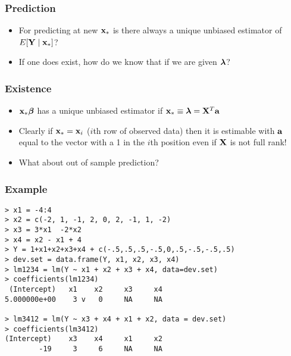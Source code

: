 \documentclass[handout]{beamer}
\begin{document}
\begin{frame} \frametitle{Prediction}
  \begin{itemize}
  \item   For predicting at new $\mathbf{x}_*$ is there always a unique unbiased
  estimator of $E[\mathbf{Y} \mid \mathbf{x}_*]$? \pause
\item If one does exist, how do we know that if we are given $\boldsymbol{\lambda}$?

  \end{itemize}

\end{frame}
\begin{frame} \frametitle{Existence}
  \begin{itemize}
  \item  $\mathbf{x}_* \boldsymbol{\beta}$ has a unique unbiased estimator if $\mathbf{x}_* \equiv
    \boldsymbol{\lambda} = \mathbf{X}^T \mathbf{a}$ \pause
\item Clearly if $\mathbf{x}_* = \mathbf{x}_i$ ($i$th row of observed data) then it is
  estimable with $\mathbf{a}$ equal to the vector with a 1 in the $i$th position
  even if $\mathbf{X}$ is not full rank! \pause
\item What about out of sample prediction? \pause
\end{itemize}

\end{frame}


\begin{frame}[fragile] \frametitle{Example}
\begin{verbatim}
> x1 = -4:4
> x2 = c(-2, 1, -1, 2, 0, 2, -1, 1, -2)
> x3 = 3*x1  -2*x2
> x4 = x2 - x1 + 4
> Y = 1+x1+x2+x3+x4 + c(-.5,.5,.5,-.5,0,.5,-.5,-.5,.5)
> dev.set = data.frame(Y, x1, x2, x3, x4)
> lm1234 = lm(Y ~ x1 + x2 + x3 + x4, data=dev.set)
> coefficients(lm1234)
 (Intercept)   x1    x2     x3     x4 
5.000000e+00    3 v   0     NA     NA 

> lm3412 = lm(Y ~ x3 + x4 + x1 + x2, data = dev.set)
> coefficients(lm3412)
(Intercept)    x3    x4     x1     x2 
        -19     3     6     NA     NA 
\end{verbatim}
\end{frame}
\end{document}
